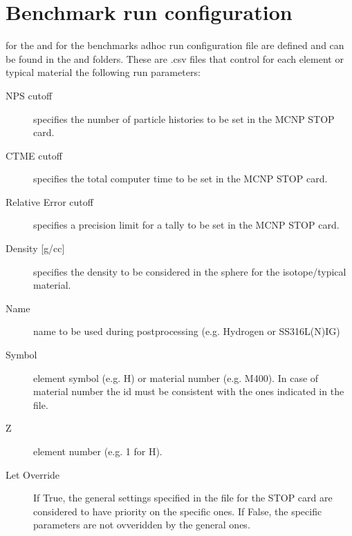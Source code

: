 \documentclass[letterpaper,10pt,english]{sphinxmanual}
\begin{document}
\section{Benchmark run configuration}
\label{\detokenize{usage/configuration:benchmark-run-configuration}}\label{\detokenize{usage/configuration:runconf}}
\sphinxAtStartPar
for the  and for the  benchmarks ad\sphinxhyphen{}hoc run
configuration file are defined and can be found in the
 and 
folders. These are .csv files that control for each element or typical material
the following run parameters:
\begin{description}
\item[{NPS cut\sphinxhyphen{}off}] \leavevmode
\sphinxAtStartPar
specifies the number of particle histories to be set in the MCNP
STOP card.

\item[{CTME cut\sphinxhyphen{}off}] \leavevmode
\sphinxAtStartPar
specifies the total computer time to be set in the MCNP STOP card.

\item[{Relative Error cut\sphinxhyphen{}off}] \leavevmode
\sphinxAtStartPar
specifies a precision limit for a tally to be set in the MCNP STOP card.

\item[{Density {[}g/cc{]}}] \leavevmode
\sphinxAtStartPar
specifies the density to be considered in the sphere for the
isotope/typical material.

\item[{Name}] \leavevmode
\sphinxAtStartPar
name to be used during post\sphinxhyphen{}processing (e.g. Hydrogen or SS316L(N)\sphinxhyphen{}IG)

\item[{Symbol}] \leavevmode
\sphinxAtStartPar
element symbol (e.g. H) or material number (e.g. M400). In case of material
number the id must be consistent with the ones indicated in the
 file.

\item[{Z}] \leavevmode
\sphinxAtStartPar
{} element number (e.g. 1 for H).

\item[{Let Override}] \leavevmode
\sphinxAtStartPar
If True, the general settings specified in the {\hyperref[\detokenize{usage/configuration:mainconfig}]{}} file
for the STOP card are considered to have priority on the specific ones.
If False, the specific parameters are not ovveridden by the general ones.

\end{description}
\end{document}
